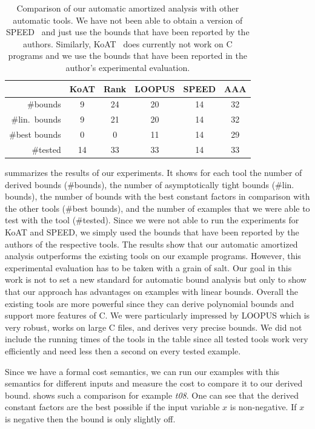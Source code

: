 \documentclass[nocopyrightspace,preprint,pldi]{sigplanconf-pldi15}
\newcommand{\pref}[1]{\prettyref{#1}}
\begin{document}
\begin{table}[t]
\centering
\begin{tabular}{r|c|c|c|c|c}
& KoAT & Rank & LOOPUS & SPEED & AAA \\
\hline
\#bounds & 9 & 24 & 20 & 14 & 32
\\
\#lin.\ bounds & 9 & 21 & 20 & 14 & 32
\\
\#best bounds & 0 & 0 & 11 & 14 & 29
\\
\#tested & 14 & 33 & 33 & 14 & 33
\end{tabular}
\vspace{.1cm}
\caption{Comparison of our automatic amortized analysis with other
  automatic tools.  We have not been able to obtain a version of
  SPEED~\cite{GulwaniMC09} and just use the bounds that have been
  reported by the authors. Similarly, KoAT~\cite{BrockschmidtEFFG14}
  does currently not work on C programs and we use the bounds that
  have been reported in the author's experimental evaluation.}
\label{tab:compar}
\end{table}


\pref{tab:compar} summarizes the results of our experiments.  It shows
for each tool the number of derived bounds (\#bounds), the number of
asymptotically tight bounds (\#lin. bounds), the number of bounds with
the best constant factors in comparison with the other tools (\#best
bounds), and the number of examples that we were able to test with the
tool (\#tested).  Since we were not able to run the experiments for KoAT
and SPEED, we simply used the bounds that have been reported by the
authors of the respective tools.  The results show that our automatic
amortized analysis outperforms the existing tools on our example
programs.  However, this experimental evaluation has to be taken with
a grain of salt.  Our goal in this work is not to set a new standard
for automatic bound analysis but only to show that our approach has
advantages on examples with linear bounds.  Overall the existing tools
are more powerful since they can derive polynomial bounds and support
more features of C.  We were particularly impressed by LOOPUS which is
very robust, works on large C files, and derives very precise bounds.
We did not include the running times of the tools in the table since
all tested tools work very efficiently and need less then a second
on every tested example.

Since we have a formal cost semantics, we can run our examples with
this semantics for different inputs and measure the cost to compare it
to our derived bound.  \pref{fig:3d} shows such a comparison for
example \emph{t08}.  One can see that the derived constant factors are the
best possible if the input variable $x$ is non-negative.  If $x$ is
negative then the bound is only slightly off.
\end{document}
